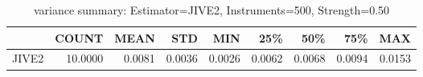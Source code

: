 \begin{table}[ht]
\centering
\caption{variance summary: Estimator=JIVE2, Instruments=500, Strength=0.50}
\begin{tabular}{lrrrrrrrr}
\toprule
 & COUNT & MEAN & STD & MIN & 25\% & 50\% & 75\% & MAX \\
\midrule
JIVE2 & 10.0000 & 0.0081 & 0.0036 & 0.0026 & 0.0062 & 0.0068 & 0.0094 & 0.0153 \\
\bottomrule
\end{tabular}
\end{table}
